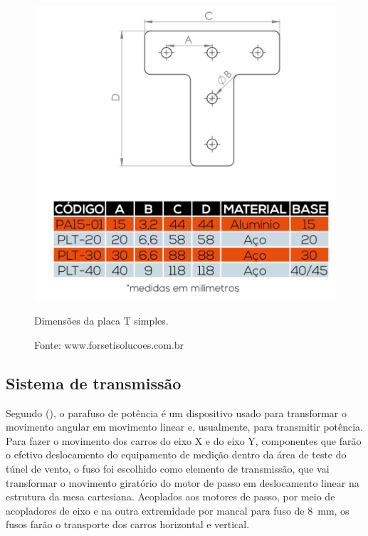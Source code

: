 \begin{figure}[!htb]
\centering
\includegraphics[scale = 0.35]{figuras/placatd}
\caption{Dimensões da placa T simples.}
\caption*{Fonte: www.forsetisolucoes.com.br}
\label{fig:placatd}
\end{figure}
    
\subsection{Sistema de transmissão}\label{subsec:mettransmissao}

Segundo \citeauthor{budynas2016elementos} (\citeyear{budynas2016elementos}), o parafuso de potência 
é um dispositivo usado para transformar o movimento angular em movimento linear e, usualmente, 
para transmitir potência. Para fazer o movimento dos carros do eixo X e do eixo Y, 
componentes que farão o efetivo deslocamento do equipamento de medição dentro da área de 
teste do túnel de vento, o fuso foi escolhido como elemento de transmissão, que vai transformar 
o movimento giratório do motor de passo em deslocamento linear na estrutura da mesa cartesiana. 
Acoplados aos motores de passo, por meio de acopladores de eixo e na outra extremidade por mancal para fuso 
de 8~mm, os fusos farão o transporte dos carros horizontal e vertical. 

